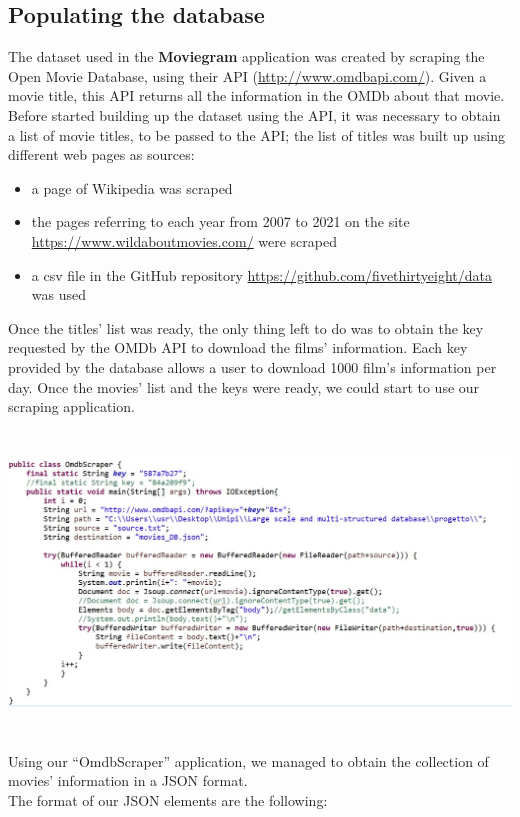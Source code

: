 \documentclass[a4paper, oneside]{article}
\begin{document}
\subsection{Populating the database}
The dataset used in the \textbf{Moviegram} application was created by scraping the Open Movie Database, using their API (\url{http://www.omdbapi.com/}). Given a movie title, this API returns all the information in the OMDb about that movie. Before started building up the dataset using the API, it was necessary to obtain a list of movie titles, to be passed to the API; the list of titles was built up using different web pages as sources:
\begin{itemize}
\item a page of Wikipedia was scraped
\item the pages referring to each year from 2007 to 2021 on the site \url{https://www.wildaboutmovies.com/} were scraped
\item a csv file in the GitHub repository \url{https://github.com/fivethirtyeight/data} was used
\end{itemize}
Once the titles’ list was ready, the only thing left to do was to obtain the key requested by the OMDb API to download the films’ information. Each key provided by the database allows a user to download 1000 film’s information per day. Once the movies’ list and the keys were ready, we could start to use our scraping application.\\

\begin{minipage}{\linewidth}
\begin{center}
\vspace{1mm}
\includegraphics[height = 80mm]{./images/screens/OMDBScraperScreen.jpg} 
\vspace{6mm}
\label{fig:OMDBScraper}
\vspace{2mm}
\end{center}
\end{minipage}
Using our “OmdbScraper” application, we managed to obtain the collection of movies’ information in a JSON format.\\ The format of our JSON elements are the following:
\end{document}
